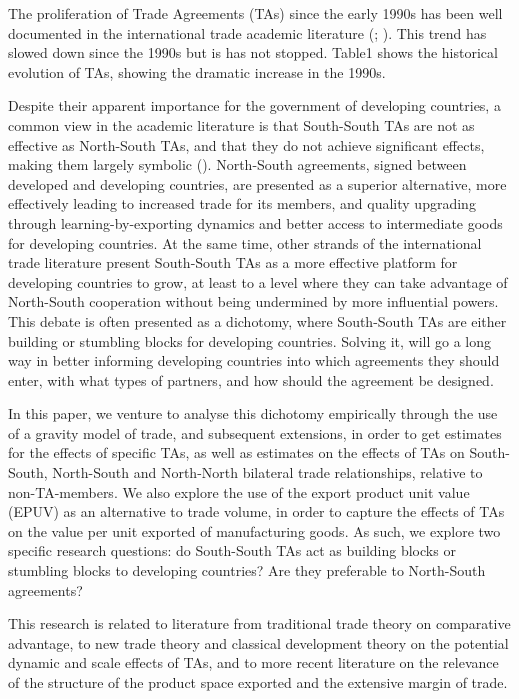 
The proliferation of Trade Agreements (TAs) since the early 1990s has
been well documented in the international trade academic literature
(\cite{dahi_preferential_2013}; \cite{mayda_south-south_2007}). This trend has slowed
down since the 1990s but is has not stopped. Table1 shows the historical
evolution of TAs, showing the dramatic increase in the 1990s.%

Despite their apparent importance for the government of developing
countries, a common view in the academic literature is that South-South
TAs are not as effective as North-South TAs, and that they do not
achieve significant effects, making them largely symbolic (\cite{gamso_leveling-up_2022}). 
North-South agreements, signed between developed and
developing countries, are presented as a superior alternative, more
effectively leading to increased trade for its members, and quality
upgrading through learning-by-exporting dynamics and better access to
intermediate goods for developing countries. At the same time, other
strands of the international trade literature present South-South TAs as
a more effective platform for developing countries to grow, at least to
a level where they can take advantage of North-South cooperation without
being undermined by more influential powers. This debate is often
presented as a dichotomy, where South-South TAs are either building or
stumbling blocks for developing countries. Solving it, will go a long
way in better informing developing countries into which agreements they
should enter, with what types of partners, and how should the agreement
be designed.

In this paper, we venture to analyse this dichotomy empirically through
the use of a gravity model of trade, and subsequent extensions, in order
to get estimates for the effects of specific TAs, as well as estimates
on the effects of TAs on South-South, North-South and North-North
bilateral trade relationships, relative to non-TA-members. We also
explore the use of the export product unit value (EPUV) as an
alternative to trade volume, in order to capture the effects of TAs on
the value per unit exported of manufacturing goods. As such, we explore
two specific research questions: do South-South TAs act as building
blocks or stumbling blocks to developing countries? Are they preferable
to North-South agreements?

This research is related to literature from traditional trade theory on
comparative advantage, to new trade theory and classical development
theory on the potential dynamic and scale effects of TAs, and to more
recent literature on the relevance of the structure of the product space
exported and the extensive margin of trade.

